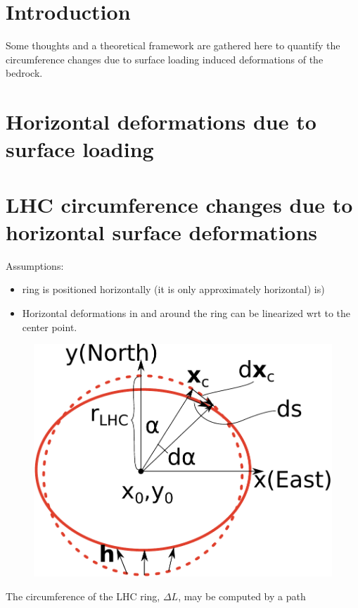 \documentclass[a4paper,10pt,twoside,openany]{article}
\title{\ititle}
\author{\iauthor}
\begin{document}
\maketitle

\section{Introduction}
Some thoughts and a theoretical framework are gathered here to
quantify the circumference changes due to surface loading induced
deformations of the bedrock.

\section{Horizontal deformations due to surface loading}
\section{LHC circumference changes due to horizontal surface
  deformations}
Assumptions:
\begin{itemize}
\item ring is positioned horizontally (it is only approximately horizontal)
  is)
  \item Horizontal deformations in and around the ring can be
    linearized wrt to the center point.
\end{itemize}
\begin{figure}
\includegraphics[width=\textwidth]{Ringschematically}
\end{figure}
The circumference of the LHC ring,  $\Delta L$, may be computed by a path
\end{document}
